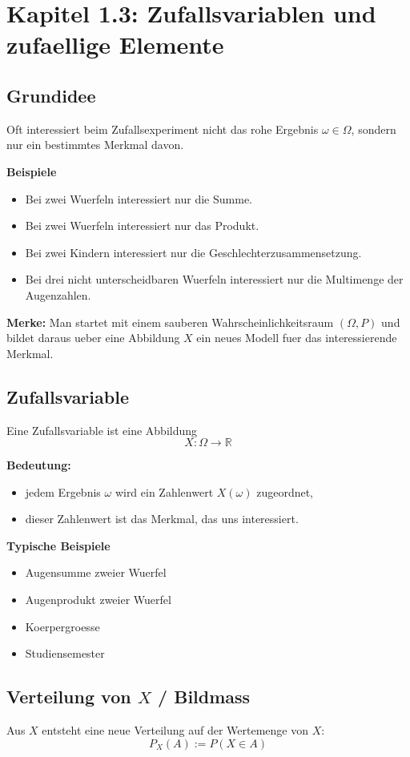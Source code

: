 \documentclass[a4paper,11pt]{article}
\begin{document}
\section{Kapitel 1.3: Zufallsvariablen und zufaellige Elemente}

\subsection{Grundidee}
Oft interessiert beim Zufallsexperiment nicht das rohe Ergebnis $\omega \in \Omega$, sondern nur ein bestimmtes Merkmal davon.

\textbf{Beispiele}
\begin{itemize}
  \item Bei zwei Wuerfeln interessiert nur die Summe.
  \item Bei zwei Wuerfeln interessiert nur das Produkt.
  \item Bei zwei Kindern interessiert nur die Geschlechterzusammensetzung.
  \item Bei drei nicht unterscheidbaren Wuerfeln interessiert nur die Multimenge der Augenzahlen.
\end{itemize}

\textbf{Merke:}
Man startet mit einem sauberen Wahrscheinlichkeitsraum $(\Omega,P)$ und bildet daraus ueber eine Abbildung $X$ ein neues Modell fuer das interessierende Merkmal.

\subsection{Zufallsvariable}
Eine Zufallsvariable ist eine Abbildung
\[
X : \Omega \to \mathbb{R}
\]

\textbf{Bedeutung:}
\begin{itemize}
  \item jedem Ergebnis $\omega$ wird ein Zahlenwert $X(\omega)$ zugeordnet,
  \item dieser Zahlenwert ist das Merkmal, das uns interessiert.
\end{itemize}

\textbf{Typische Beispiele}
\begin{itemize}
  \item Augensumme zweier Wuerfel
  \item Augenprodukt zweier Wuerfel
  \item Koerpergroesse
  \item Studiensemester
\end{itemize}

\subsection{\texorpdfstring{Verteilung von $X$ / Bildmass}{Verteilung von X / Bildmass}}
Aus $X$ entsteht eine neue Verteilung auf der Wertemenge von $X$:
\[
P_X(A) := P(X \in A)
\]
\end{document}
